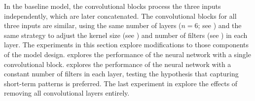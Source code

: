 
In the baseline model, the convolutional blocks process the
three inputs independently, which are later concatenated.
The convolutional blocks for all three inputs are similar,
using the same number of layers ($n=6$; see
) and the same
strategy to adjust the kernel size (see
) and number of filters (see
) in each layer. The
experiments in this section explore modifications to those
components of the model design.
 explores the
performance of the neural network with a single
convolutional block. 
explores the performance of the neural network with a
constant number of filters in each layer, testing the
hypothesis that capturing short-term patterns is preferred.
The last experiment in 
explore the effects of removing all convolutional layers
entirely.
